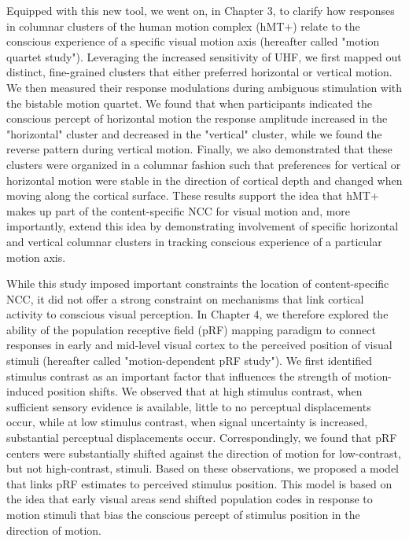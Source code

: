 Equipped with this new tool, we went on, in Chapter 3, to clarify how responses in columnar clusters of the human motion complex (hMT+) relate to the conscious experience of a specific visual motion axis (hereafter called "motion quartet study"). Leveraging the increased sensitivity of UHF, we first mapped out distinct, fine-grained clusters that either preferred horizontal or vertical motion. We then measured their response modulations during ambiguous stimulation with the bistable motion quartet. We found that when participants indicated the conscious percept of horizontal motion the response amplitude increased in the "horizontal" cluster and decreased in the "vertical" cluster, while we found the reverse pattern during vertical motion. Finally, we also demonstrated that these clusters were organized in a columnar fashion such that preferences for vertical or horizontal motion were stable in the direction of cortical depth and changed when moving along the cortical surface. These results support the idea that hMT+ makes up part of the content-specific NCC for visual motion and, more importantly, extend this idea by demonstrating involvement of specific horizontal and vertical columnar clusters in tracking conscious experience of a particular motion axis.

While this study imposed important constraints the location of content-specific NCC, it did not offer a strong constraint on mechanisms that link cortical activity to conscious visual perception. In Chapter 4, we therefore explored the ability of the population receptive field (pRF) mapping paradigm to connect responses in early and mid-level visual cortex to the perceived position of visual stimuli (hereafter called "motion-dependent pRF study"). We first identified stimulus contrast as an important factor that influences the strength of motion-induced position shifts. We observed that at high stimulus contrast, when sufficient sensory evidence is available, little to no perceptual displacements occur, while at low stimulus contrast, when signal uncertainty is increased, substantial perceptual displacements occur. Correspondingly, we found that pRF centers were substantially shifted against the direction of motion for low-contrast, but not high-contrast, stimuli. Based on these observations, we proposed a model that links pRF estimates to perceived stimulus position. This model is based on the idea that early visual areas send shifted population codes in response to motion stimuli that bias the conscious percept of stimulus position in the direction of motion.

